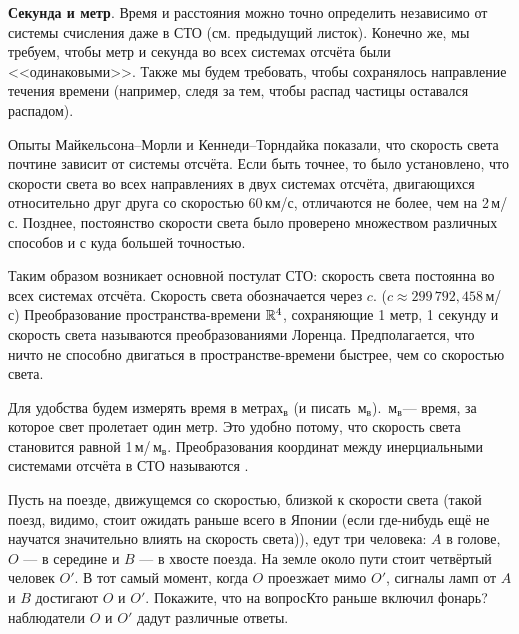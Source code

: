 \documentclass[a4paper,12pt]{article}
\newcommand{\мв}{\,м$_в$\xspace}
\begin{document}

{\footnotesize
\noindent\textbf{Секунда и метр}.
Время и расстояния можно точно определить независимо от системы счисления даже в СТО (см. предыдущий листок).
Конечно же, мы требуем, чтобы метр и секунда во всех системах отсчёта были <<одинаковыми>>.
Также мы будем требовать, чтобы сохранялось направление течения времени (например, следя за тем, чтобы распад частицы оставался распадом).

Опыты Майкельсона--Морли и Кеннеди--Торндайка показали, что скорость света  почти не зависит от системы отсчёта.
Если быть точнее, то было установлено, что скорости света во всех направлениях в двух системах отсчёта, двигающихся относительно друг друга со скоростью 60\,км/с, отличаются не более, чем на 2\,м/с.
Позднее, постоянство скорости света было проверено множеством различных способов и с куда большей точностью.

Таким образом возникает основной постулат СТО: скорость света постоянна во всех системах отсчёта.
Скорость света обозначается через $c$. ($c\approx299\,792,458$\,м/с)
Преобразование пространства-времени $\mathbb{R}^4$, сохраняющие 1 метр, 1 секунду и скорость света называются преобразованиями  Лоренца.
Предполагается, что ничто не способно двигаться в пространстве-времени быстрее, чем со скоростью света.

Для удобства будем измерять время в метрах$_в$ (и писать \мв).
\мв --- время, за которое свет пролетает один метр.
Это удобно потому, что скорость света становится равной 1\,м/\мв.
Преобразования координат между инерциальными системами отсчёта в СТО называются  .
\par
}


Пусть на поезде, движущемся со скоростью, близкой к скорости света (такой поезд, видимо, стоит ожидать раньше всего в Японии (если где-нибудь ещё не научатся значительно влиять на скорость света)), едут три человека: $A$ в голове, $O$ --- в середине и  $B$ --- в хвосте поезда. На земле около пути стоит четвёртый человек $O'$. В тот самый момент, когда $O$ проезжает мимо $O'$, сигналы ламп от $A$ и $B$ достигают $O$ и $O'$.
Покажите, что на вопрос Кто раньше включил фонарь? наблюдатели $O$ и $O'$ дадут различные ответы.
\end{document}
